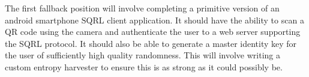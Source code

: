 The first fallback position will involve completing a primitive version of an android smartphone SQRL client application. It should have the ability to scan a QR code using the camera and authenticate the user to a web server supporting the SQRL protocol. It should also be able to generate a master identity key for the user of sufficiently high quality randomness. This will involve writing a custom entropy harvester to ensure this is as strong as it could possibly be.
